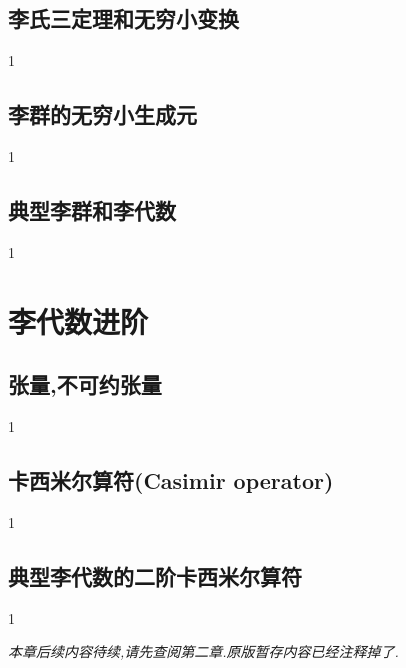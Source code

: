 \subsection{李氏三定理和无穷小变换}
1
\subsection{李群的无穷小生成元}
1
\subsection{典型李群和李代数}
1
\section{李代数进阶}
\subsection{张量,不可约张量}
1
\subsection{卡西米尔算符(Casimir operator)}
1
\subsection{典型李代数的二阶卡西米尔算符}
1



\textit{本章后续内容待续,请先查阅第二章.原版暂存内容已经注释掉了.}

